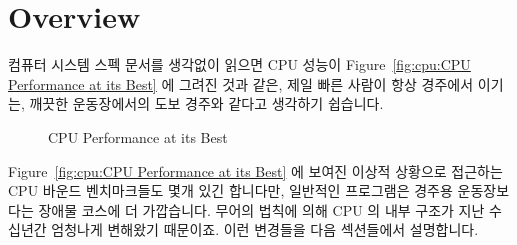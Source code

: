 
\section{Overview}
\label{sec:cpu:Overview}

컴퓨터 시스템 스펙 문서를 생각없이 읽으면 CPU 성능이 Figure~\ref{fig:cpu:CPU
Performance at its Best} 에 그려진 것과 같은, 제일 빠른 사람이 항상 경주에서
이기는, 깨끗한 운동장에서의 도보 경주와 같다고 생각하기 쉽습니다.

\begin{figure}[htb]
\centering
{}
\caption{CPU Performance at its Best}
\end{figure}

Figure~\ref{fig:cpu:CPU Performance at its Best} 에 보여진 이상적 상황으로
접근하는 CPU 바운드 벤치마크들도 몇개 있긴 합니다만, 일반적인 프로그램은 경주용
운동장보다는 장애물 코스에 더 가깝습니다.
무어의 법칙에 의해 CPU 의 내부 구조가 지난 수십년간 엄청나게 변해왔기 때문이죠.
이런 변경들을 다음 섹션들에서 설명합니다.

